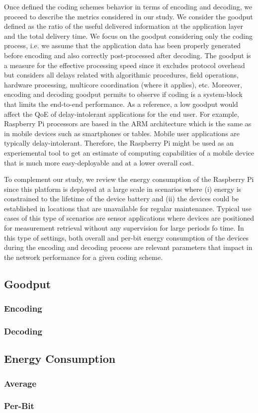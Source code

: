 \label{sec:metrics}

Once defined the coding schemes behavior in terms of encoding
and decoding, we proceed to describe the metrics considered in our study.
We consider the goodput defined as the ratio of the useful delivered
information at the application layer and the total delivery time. We focus
on the goodput considering only the coding process, i.e. we assume that
the application data has been properly generated before encoding and
also correctly post-processed after decoding. The goodput is a measure
for the effective processing speed since it excludes protocol overhead
but considers all delays related with algorithmic procedures, field
operations, hardware processing, multicore coordination (where it applies),
etc. Moreover, encoding and decoding goodput permits to observe if coding is
a system-block that limits the end-to-end performance. As a reference, a low
goodput would affect the \ac{QoE} of delay-intolerant applications for the
end user. For example, Raspberry Pi processors are based in the \ac{ARM}
architecture which is the same as in mobile devices such as smartphones or
tables. Mobile user applications are typically delay-intolerant.
Therefore, the Raspberry Pi might be used as an experiemental tool to
get an estimate of computing capabilities of a mobile device that is
much more easy-deployable and at a lower overall cost.

To complement our study, we review the energy consumption of the Raspberry
Pi since this platform is deployed at a large scale in scenarios where (i)
energy is constrained to the lifetime of the device battery and (ii) the
devices could be established in locations that are unavailable for
regular maintenance. Typical use cases of this type of scenarios are
sensor applications where devices are positioned for measurement retrieval
without any supervision for large periods fo time. In this type of settings,
both overall and per-bit energy consumption of the devices during the
encoding and decoding process are relevant parameters that impact in the
network performance for a given coding scheme.

\subsection{Goodput}
\subsubsection{Encoding}
\subsubsection{Decoding}

\subsection{Energy Consumption}
\subsubsection{Average }
\subsubsection{Per-Bit}